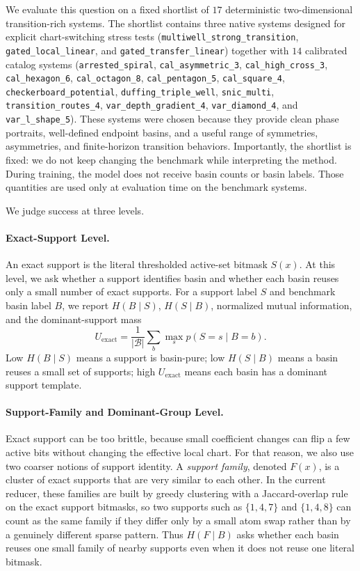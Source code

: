 We evaluate this question on a fixed shortlist of $17$ deterministic
two-dimensional transition-rich systems. The shortlist contains three native
systems designed for explicit chart-switching stress tests
(\texttt{multiwell\_strong\_transition}, \texttt{gated\_local\_linear}, and
\texttt{gated\_transfer\_linear}) together with $14$ calibrated catalog
systems (\texttt{arrested\_spiral}, \texttt{cal\_asymmetric\_3},
\texttt{cal\_high\_cross\_3}, \texttt{cal\_hexagon\_6},
\texttt{cal\_octagon\_8}, \texttt{cal\_pentagon\_5},
\texttt{cal\_square\_4}, \texttt{checkerboard\_potential},
\texttt{duffing\_triple\_well}, \texttt{snic\_multi},
\texttt{transition\_routes\_4}, \texttt{var\_depth\_gradient\_4},
\texttt{var\_diamond\_4}, and \texttt{var\_l\_shape\_5}). These systems were
chosen because they provide clean phase portraits, well-defined endpoint
basins, and a useful range of symmetries, asymmetries, and finite-horizon
transition behaviors. Importantly, the shortlist is fixed: we do not keep
changing the benchmark while interpreting the method. During training, the
model does not receive basin counts or basin labels. Those quantities are used
only at evaluation time on the benchmark systems.

We judge success at three levels.

\paragraph{Exact-Support Level.}
An exact support is the literal thresholded active-set bitmask $S(x)$. At this
level, we ask whether a support identifies basin and whether each basin reuses
only a small number of exact supports. For a support label $S$ and benchmark
basin label $B$, we report $H(B \mid S)$, $H(S \mid B)$, normalized mutual
information, and the dominant-support mass
\begin{equation}
    U_{\mathrm{exact}}
    =
    \frac{1}{|\mathcal{B}|}
    \sum_{b}
    \max_{s} p(S=s \mid B=b).
\end{equation}
Low $H(B \mid S)$ means a support is basin-pure; low $H(S \mid B)$ means a
basin reuses a small set of supports; high $U_{\mathrm{exact}}$ means each
basin has a dominant support template.

\paragraph{Support-Family and Dominant-Group Level.}
Exact support can be too brittle, because small coefficient changes can flip a
few active bits without changing the effective local chart. For that reason,
we also use two coarser notions of support identity. A \emph{support family},
denoted $F(x)$, is a cluster of exact supports that are very similar to each
other. In the current reducer, these families are built by greedy clustering
with a Jaccard-overlap rule on the exact support bitmasks, so two supports
such as $\{1,4,7\}$ and $\{1,4,8\}$ can count as the same family if they
differ only by a small atom swap rather than by a genuinely different sparse
pattern. Thus $H(F \mid B)$ asks whether each basin reuses one small family of
nearby supports even when it does not reuse one literal bitmask.


